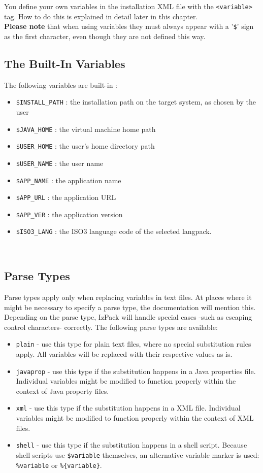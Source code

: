 You define your own variables in the installation XML file with the
\texttt{<variable>} tag. How to do this is explained in detail later in
this chapter.\\

\textbf{Please note} that when using variables they must always appear
with a '\texttt{\$}' sign as the first character, even though they are
not defined this way.\\

\subsection{The Built-In Variables}
The following variables are built-in :
\begin{itemize}
  \item \texttt{\$INSTALL\_PATH} : the installation path on the
        target system, as chosen by the user
  \item \texttt{\$JAVA\_HOME} : the \Java virtual machine home path
  \item \texttt{\$USER\_HOME} : the user's home directory path
  \item \texttt{\$USER\_NAME} : the user name
  \item \texttt{\$APP\_NAME} : the application name
  \item \texttt{\$APP\_URL} : the application URL
  \item \texttt{\$APP\_VER} : the application version
  \item \texttt{\$ISO3\_LANG} : the ISO3 language code of the selected langpack.
\end{itemize}\

\subsection{Parse Types}
Parse types apply only when replacing variables in text files. At places
where it might be necessary to specify a parse type, the documentation
will mention this. Depending on the parse type, IzPack will handle
special cases -such as escaping control characters- correctly. The
following parse types are available:
\begin{itemize}
  \item \texttt{plain} - use this type for plain text files, where no
        special substitution rules apply. All variables will be
        replaced with their respective values as is.
  \item \texttt{javaprop} - use this type if the substitution happens
        in a Java properties file. Individual variables might be
        modified to function properly within the context of Java
        property files.
  \item \texttt{xml} - use this type if the substitution happens in
        a XML file. Individual variables might be modified to function
        properly within the context of XML files.
  \item \texttt{shell} - use this type if the substitution happens in
        a shell script. Because shell scripts use \texttt{\$variable} 
        themselves, an alternative variable marker is used: 
        \texttt{\%variable} or \texttt{\%\{variable\}}.
\end{itemize}

